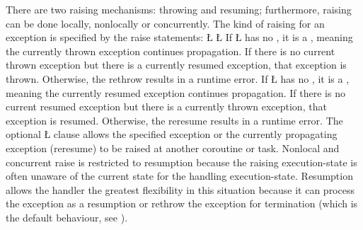 \documentclass[openright,twoside]{report}
\begin{document}
There are two raising mechanisms: throwing and resuming;
furthermore, raising can be done locally, nonlocally or concurrently.
The kind of raising for an exception is specified by the raise statements:
\LGinlinefalse\LGbegin\lgrinde
\L{}
\L{}
\endlgrinde\LGend
{}%
%
%
If \LGinlinetrue\LGbegin\lgrinde\L{}\endlgrinde\LGend{} has no , it is a , meaning the currently thrown exception continues propagation.
If there is no current thrown exception but there is a currently resumed exception, that exception is thrown.
Otherwise, the rethrow results in a runtime error.
If \LGinlinetrue\LGbegin\lgrinde\L{}\endlgrinde\LGend{} has no , it is a , meaning the currently resumed exception continues propagation.
If there is no current resumed exception but there is a currently thrown exception, that exception is resumed.
Otherwise, the reresume results in a runtime error.
The optional \LGinlinetrue\LGbegin\lgrinde\L{}\endlgrinde\LGend{} clause allows the specified exception or the currently propagating exception (reresume) to be raised at another coroutine or task.
Nonlocal and concurrent raise is restricted to resumption because the raising execution-state is often unaware of the current state for the handling execution-state.
Resumption allows the handler the greatest flexibility in this situation because it can process the exception as a resumption or rethrow the exception for termination (which is the default behaviour, see ).
\end{document}
